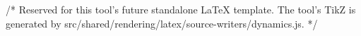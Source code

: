 /* Reserved for this tool's future standalone LaTeX template. The tool's TikZ is generated by src/shared/rendering/latex/source-writers/dynamics.js. */
